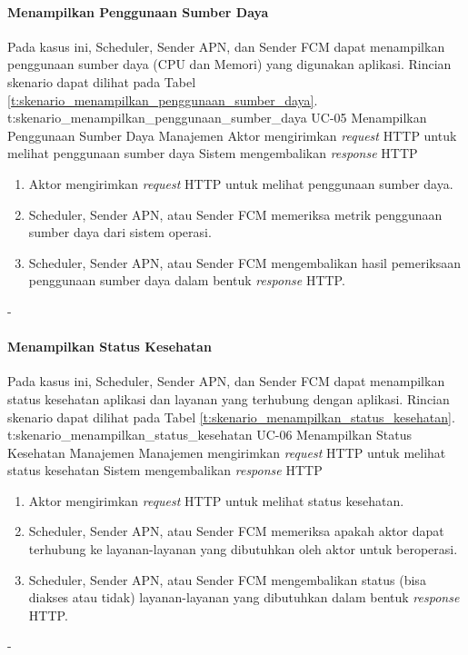 \paragraph{Menampilkan Penggunaan Sumber Daya}
\par Pada kasus ini, Scheduler, Sender APN, dan Sender FCM dapat menampilkan penggunaan sumber daya (CPU dan Memori) yang digunakan aplikasi. Rincian skenario dapat dilihat pada Tabel \ref{t:skenario_menampilkan_penggunaan_sumber_daya}.
\tableUcDesc
{t:skenario_menampilkan_penggunaan_sumber_daya}
{UC-05}
{Menampilkan Penggunaan Sumber Daya}
{Manajemen}
{Aktor mengirimkan \textit{request} HTTP untuk melihat penggunaan sumber daya}
{Sistem mengembalikan \textit{response} HTTP}
{
\begin{enumerate}
	\item Aktor mengirimkan \textit{request} HTTP untuk melihat penggunaan sumber daya.
	\item Scheduler, Sender APN, atau Sender FCM memeriksa metrik penggunaan sumber daya dari sistem operasi.
	\item Scheduler, Sender APN, atau Sender FCM mengembalikan hasil pemeriksaan penggunaan sumber daya dalam bentuk \textit{response} HTTP.
\end{enumerate}
}
{-}
\clearpage

\paragraph{Menampilkan Status Kesehatan}
\par Pada kasus ini, Scheduler, Sender APN, dan Sender FCM dapat menampilkan status kesehatan aplikasi dan layanan yang terhubung dengan aplikasi. Rincian skenario dapat dilihat pada Tabel \ref{t:skenario_menampilkan_status_kesehatan}.
\tableUcDesc
{t:skenario_menampilkan_status_kesehatan}
{UC-06}
{Menampilkan Status Kesehatan}
{Manajemen}
{Manajemen mengirimkan \textit{request} HTTP untuk melihat status kesehatan}
{Sistem mengembalikan \textit{response} HTTP}
{
\begin{enumerate}
	\item Aktor mengirimkan \textit{request} HTTP untuk melihat status kesehatan.
	\item Scheduler, Sender APN, atau Sender FCM memeriksa apakah aktor dapat terhubung ke layanan-layanan yang dibutuhkan oleh aktor untuk beroperasi.
	\item Scheduler, Sender APN, atau Sender FCM mengembalikan status (bisa diakses atau tidak) layanan-layanan yang dibutuhkan dalam bentuk \textit{response} HTTP.
\end{enumerate}
}
{-}
\clearpage

